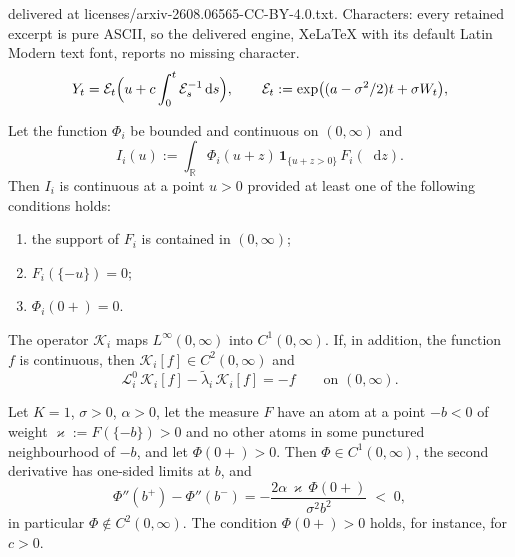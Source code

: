 \documentclass[10pt,a4paper]{amsart}
\newcommand{\Ind}{\mathbf{1}}
\newcommand{\bbr}{\mathbb{R}}
\newcommand{\diff}{\mathop{}\!\mathrm{d}}
\begin{document}
delivered at licenses/arxiv-2608.06565-CC-BY-4.0.txt. Characters: every retained excerpt is pure ASCII, so the delivered engine, XeLaTeX with its default Latin Modern text font, reports no missing character.
\begin{equation}
    \label{eq:Yexpl}
    Y_t=\mathcal E_t\Bigl(u+c\int_0^t\mathcal E_s^{-1}\diff s\Bigr) ,
    \qquad
    \mathcal E_t:=\exp\bigl((a-\sigma^2/2)t+\sigma W_t\bigr) ,
\end{equation}

\begin{lemma}
\label{lem:convolution}
Let the function $\Phi_i$ be bounded and continuous on $(0,\infty)$ and
$$
I_i(u):=\int_{\bbr}\Phi_i(u+z)\,\Ind_{\{u+z>0\}}\,F_i(\diff z).
$$
Then $I_i$ is continuous at a point $u>0$ provided at least one of the
following conditions holds:
\begin{enumerate}
\item[\rm(i)] the support of $F_i$ is contained in $(0,\infty)$;
\item[\rm(ii)] $F_i(\{-u\})=0$;
\item[\rm(iii)] $\Phi_i(0+)=0$.
\end{enumerate}
\end{lemma}

\begin{lemma}
\label{lem:LtoC}
The operator $\mathcal K_i$ maps $L^\infty(0,\infty)$ into $C^1(0,\infty)$. If,
in addition, the function $f$ is continuous, then
$\mathcal K_i[f]\in C^2(0,\infty)$ and
\begin{equation}
    \label{eq:resolvent_ode}
    \mathcal L_i^0\,\mathcal K_i[f]-\tilde\lambda_i\,\mathcal K_i[f]=-f
    \qquad \text{on } (0,\infty).
\end{equation}
\end{lemma}

\begin{proposition}
\label{prop:counterexample}
Let $K=1$, $\sigma>0$, $\alpha>0$, let the measure $F$ have an atom at a point
$-b<0$ of weight $\varkappa:=F(\{-b\})>0$ and no other atoms in some punctured
neighbourhood of $-b$, and let $\Phi(0+)>0$. Then $\Phi\in C^1(0,\infty)$, the
second derivative has one-sided limits at $b$, and
\begin{equation}
    \label{eq:jump}
    \Phi''(b^+)-\Phi''(b^-)=-\frac{2\alpha\,\varkappa\,\Phi(0+)}{\sigma^2b^2}
    \;<\;0 ,
\end{equation}
in particular $\Phi\notin C^2(0,\infty)$. The condition $\Phi(0+)>0$ holds,
for instance, for $c>0$.
\end{proposition}
\end{document}
